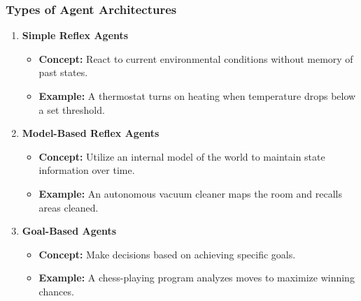 \documentclass[aspectratio=169]{beamer}
\begin{document}
\begin{frame}[fragile]
    \frametitle{Types of Agent Architectures}
    \begin{enumerate}
        \item \textbf{Simple Reflex Agents}
        \begin{itemize}
            \item \textbf{Concept:} React to current environmental conditions without memory of past states.
            \item \textbf{Example:} A thermostat turns on heating when temperature drops below a set threshold.
        \end{itemize}
        
        \item \textbf{Model-Based Reflex Agents}
        \begin{itemize}
            \item \textbf{Concept:} Utilize an internal model of the world to maintain state information over time.
            \item \textbf{Example:} An autonomous vacuum cleaner maps the room and recalls areas cleaned.
        \end{itemize}
        
        \item \textbf{Goal-Based Agents}
        \begin{itemize}
            \item \textbf{Concept:} Make decisions based on achieving specific goals.
            \item \textbf{Example:} A chess-playing program analyzes moves to maximize winning chances.
        \end{itemize}
    \end{enumerate}
\end{frame}
\end{document}
